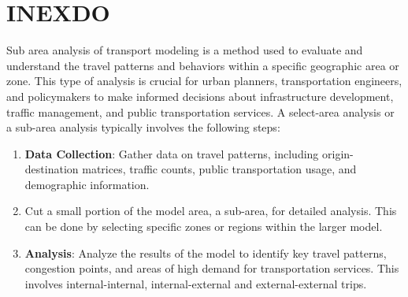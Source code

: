 \documentclass[
  letterpaper,
  DIV=11,
  numbers=noendperiod]{scrreprt}
\newenvironment{Shaded}{\begin{snugshade}}{\end{snugshade}}
\newcommand{\AttributeTok}[1]{\textcolor[rgb]{0.40,0.45,0.13}{#1}}
\newcommand{\ControlFlowTok}[1]{\textcolor[rgb]{0.00,0.23,0.31}{\textbf{#1}}}
\newcommand{\FunctionTok}[1]{\textcolor[rgb]{0.28,0.35,0.67}{#1}}
\newcommand{\OperatorTok}[1]{\textcolor[rgb]{0.37,0.37,0.37}{#1}}
\newcommand{\VariableTok}[1]{\textcolor[rgb]{0.07,0.07,0.07}{#1}}
\newcommand{\VerbatimStringTok}[1]{\textcolor[rgb]{0.13,0.47,0.30}{#1}}
\begin{document}
\begin{Shaded}
\end{Shaded}

\chapter{INEXDO}\label{inexdo}

Sub area analysis of transport modeling is a method used to evaluate and
understand the travel patterns and behaviors within a specific
geographic area or zone. This type of analysis is crucial for urban
planners, transportation engineers, and policymakers to make informed
decisions about infrastructure development, traffic management, and
public transportation services. A select-area analysis or a sub-area
analysis typically involves the following steps:

\begin{enumerate}
\def\labelenumi{\arabic{enumi}.}
\item
  \textbf{Data Collection}: Gather data on travel patterns, including
  origin-destination matrices, traffic counts, public transportation
  usage, and demographic information.
\item
  Cut a small portion of the model area, a sub-area, for detailed
  analysis. This can be done by selecting specific zones or regions
  within the larger model.
\item
  \textbf{Analysis}: Analyze the results of the model to identify key
  travel patterns, congestion points, and areas of high demand for
  transportation services. This involves internal-internal,
  internal-external and external-external trips.
\end{enumerate}
\end{document}

